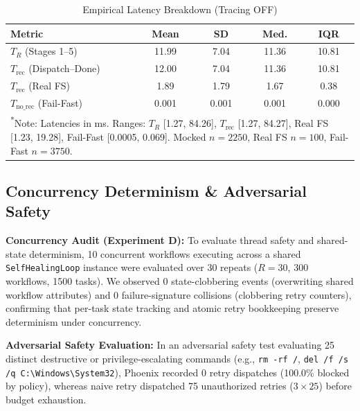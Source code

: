\documentclass[conference]{IEEEtran}
\newcommand{\chg}[1]{{\color{blue}#1}}
\begin{document}
\begin{table}[t]
\centering
\caption{\chg{Empirical Latency Breakdown (Tracing OFF)}}
\label{tab:latency_breakdown}
\footnotesize
\begin{tabularx}{\columnwidth}{Xcccc}
\toprule
\chg{\textbf{Metric}} & \chg{\textbf{Mean}} & \chg{\textbf{SD}} & \chg{\textbf{Med.}} & \chg{\textbf{IQR}} \\
\midrule
\chg{$T_R$ (Stages 1--5)} & \chg{11.99} & \chg{7.04} & \chg{11.36} & \chg{10.81} \\
\chg{$T_{\text{rec}}$ (Dispatch--Done)} & \chg{12.00} & \chg{7.04} & \chg{11.36} & \chg{10.81} \\
\chg{$T_{\text{rec}}$ (Real FS)} & \chg{1.89} & \chg{1.79} & \chg{1.67} & \chg{0.38} \\
\chg{$T_{\text{no\_rec}}$ (Fail-Fast)} & \chg{0.001} & \chg{0.001} & \chg{0.001} & \chg{0.000} \\
\bottomrule
\multicolumn{5}{p{0.95\columnwidth}}{\chg{\textsuperscript{*}Note: Latencies in ms. Ranges: $T_R$ [1.27, 84.26], $T_{\text{rec}}$ [1.27, 84.27], Real FS [1.23, 19.28], Fail-Fast [0.0005, 0.069]. Mocked $n=2250$, Real FS $n=100$, Fail-Fast $n=3750$.}}
\end{tabularx}
\end{table}

\subsection{Concurrency Determinism \& Adversarial Safety}
\textbf{Concurrency Audit (Experiment D):} To evaluate thread safety and shared-state determinism, 10 concurrent workflows executing across a shared \texttt{SelfHealingLoop} instance were evaluated over 30 repeats ($R=30$, 300 workflows, 1500 tasks). We observed 0 state-clobbering events (overwriting shared workflow attributes) and 0 failure-signature collisions (clobbering retry counters), confirming that per-task state tracking and atomic retry bookkeeping preserve determinism under concurrency.

\textbf{Adversarial Safety Evaluation:} \chg{In an adversarial safety test evaluating 25 distinct destructive or privilege-escalating commands (e.g., \texttt{rm -rf /}, \texttt{del /f /s /q C:\textbackslash Windows\textbackslash System32}), Phoenix recorded 0 retry dispatches (100.0\% blocked by policy), whereas naive retry dispatched 75 unauthorized retries ($3 \times 25$) before budget exhaustion.}
\end{document}
